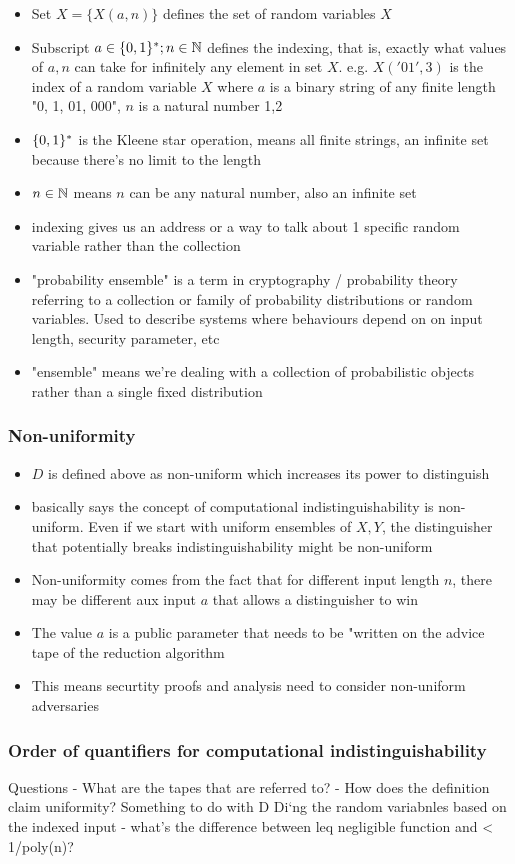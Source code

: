 \begin{itemize}
    \item Set $X = \{X(a,n)\}$ defines the set of random variables $X$
    \item Subscript ${a\in\{0,1\}^*; n \in \mathbb{N}}$ defines the indexing, that is, exactly what values of $a, n$ can take for infinitely any element in set $X$. e.g. $X('01', 3)$ is the index of a random variable $X$ where $a$ is a binary string of any finite length "0, 1, 01, 000", $n$ is a natural number 1,2
    \item $\{0,1\}^*$ is the Kleene star operation, means all finite strings, an infinite set because there's no limit to the length
    \item $n\in\mathbb{N}$ means $n$ can be any natural number, also an infinite set
    \item indexing gives us an address or a way to talk about 1 specific random variable rather than the collection
    \item "probability ensemble" is a term in cryptography / probability theory referring to a collection or family of probability distributions or random variables. Used to describe systems where behaviours depend on on input length, security parameter, etc
    \item "ensemble" means we're dealing with a collection of probabilistic objects rather than a single fixed distribution
\end{itemize}


\subsubsection*{Non-uniformity}
\begin{itemize}
    \item $D$ is defined above as non-uniform which increases its power to distinguish
    \item basically says the concept of computational indistinguishability is non-uniform. Even if we start with uniform ensembles of $X, Y$, the distinguisher that potentially breaks indistinguishability might be non-uniform
    \item Non-uniformity comes from the fact that for different input length $n$, there may be different aux input $a$ that allows a distinguisher to win
    \item The value $a$ is a public parameter that needs to be "written on the advice tape of the reduction algorithm
    \item This means securtity proofs and analysis need to consider non-uniform adversaries 
\end{itemize}

\subsubsection*{Order of quantifiers for computational indistinguishability}


Questions
- What are the tapes that are referred to?
- How does the definition claim uniformity? Something to do with D Di`ng the random variabnles based on the indexed input
- what's the difference between leq negligible function and < 1/poly(n)?
